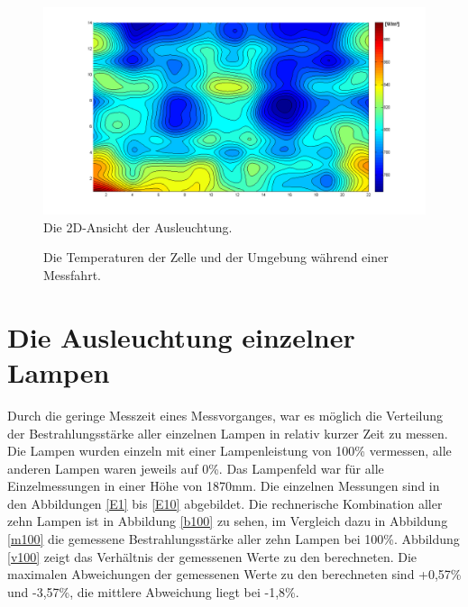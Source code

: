 \documentclass[a4paper,bibtotoc,oneside]{scrbook}
\begin{document}
\begin{figure}[htbp]
\centering
\includegraphics[width=125mm]{img/g2d.png}
\caption{Die 2D-Ansicht der Ausleuchtung.}\label{g2d}
\end{figure}

\begin{figure} [htbp]
\caption{Die Temperaturen der Zelle und der Umgebung während einer Messfahrt.}
\label{t}
\end{figure} 

\FloatBarrier


\section{Die Ausleuchtung einzelner Lampen}

Durch die geringe Messzeit eines Messvorganges, war es möglich die Verteilung der Bestrahlungsstärke aller einzelnen Lampen in relativ kurzer Zeit zu messen. Die Lampen wurden einzeln mit einer Lampenleistung von 100\% vermessen, alle anderen Lampen waren jeweils auf 0\%. Das Lampenfeld war für alle Einzelmessungen in einer Höhe von 1870mm.
Die einzelnen Messungen sind in den Abbildungen \ref{E1} bis \ref{E10} abgebildet.
Die rechnerische Kombination aller zehn Lampen ist in Abbildung \ref{b100} zu sehen, im Vergleich dazu in Abbildung \ref{m100} die gemessene Bestrahlungsstärke aller zehn Lampen bei 100\%.
Abbildung \ref{v100} zeigt das Verhältnis der gemessenen Werte zu den berechneten. Die maximalen Abweichungen der gemessenen Werte zu den berechneten sind +0,57\% und -3,57\%, die mittlere Abweichung liegt bei -1,8\%. 
\end{document}
